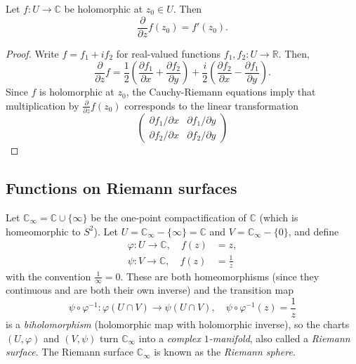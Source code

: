 \documentclass[10pt]{article}
\providecommand{\half}{\frac{1}{2}}
\providecommand{\CC}{\mathbb C}
\providecommand{\RR}{\mathbb R}
\providecommand{\inv}{^{-1}}
\providecommand{\vocab}[1]{{{\sffamily\textit{#1}}}}
\begin{document}
\begin{prop}
    \label{prop:dz-equals-derivative}
    Let $f\colon U\to\CC$ be holomorphic at $z_0\in U$. Then
    \begin{equation*}
	\frac\partial{\partial z}f(z_0) = f'(z_0).
    \end{equation*}
\end{prop}

\begin{proof}
    Write $f = f_1 + if_2$ for real-valued functions $f_1,f_2\colon U\to\RR$.
    Then,
    \begin{equation*}
	\frac\partial{\partial z}f
	= \half\left(\frac{\partial f_1}{\partial x}
	+ \frac{\partial f_2}{\partial y}\right)
	+ \frac i2\left(\frac{\partial f_2}{\partial x}
	- \frac{\partial f_1}{\partial y}\right).
    \end{equation*}
    Since $f$ is holomorphic at $z_0$,
    the Cauchy-Riemann equations imply that
    multiplication by $\frac\partial{\partial z}f(z_0)$
    corresponds to the linear transformation
    \begin{equation*}
        \begin{pmatrix}
	    \partial f_1/\partial x & \partial f_1/\partial y\\
	    \partial f_2/\partial x & \partial f_2/\partial y
        \end{pmatrix}
    \end{equation*}
\end{proof}

\subsection{Functions on Riemann surfaces}

Let $\CC_{\infty} = \CC\cup\{\infty\}$ be the one-point compactification
of $\CC$ (which is homeomorphic to $S^2$).
Let $U = \CC_{\infty} - \{\infty\} = \CC$ and $V = \CC_\infty-\{0\}$,
and define
\begin{align*}
    \varphi\colon U\to\CC,\quad f(z) &= z,\\
    \psi\colon V\to\CC,\quad f(z) &= \frac 1z
\end{align*}
with the convention $\frac 1\infty = 0$.
These are both homeomorphisms (since they continuous
and are both their own inverse) and the transition map
\begin{equation*}
    \psi\circ\varphi\inv\colon\varphi(U\cap V)\to\psi(U\cap V),
    \quad \psi\circ\varphi\inv(z) = \frac 1z
\end{equation*}
is a \vocab{biholomorphism} (holomorphic map with holomorphic inverse),
so the charts $(U,\varphi)$ and $(V,\psi)$ turn $\CC_\infty$
into a \vocab{complex $1$-manifold}, also called a \vocab{Riemann surface}.
The Riemann surface $\CC_\infty$ is known as the \vocab{Riemann sphere}.
\end{document}
